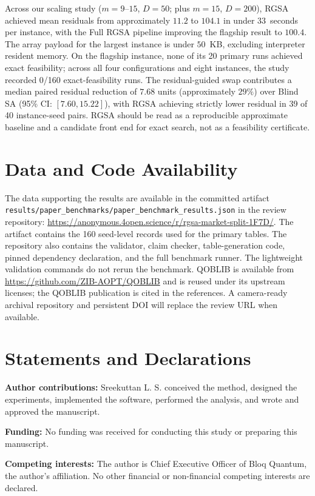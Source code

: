 \documentclass[11pt]{article}
\begin{document}
Across our scaling study ($m=9$--$15$, $D=50$; plus $m=15$, $D=200$), RGSA achieved mean residuals from approximately $11.2$ to $104.1$ in under $33$~seconds per instance, with the Full RGSA pipeline improving the flagship result to $100.4$. The array payload for the largest instance is under $50$~KB, excluding interpreter resident memory. On the flagship instance, none of its 20 primary runs achieved exact feasibility; across all four configurations and eight instances, the study recorded 0/160 exact-feasibility runs. The residual-guided swap contributes a median paired residual reduction of $7.68$ units (approximately $29\%$) over Blind SA (95\% CI: $[7.60,15.22]$), with RGSA achieving strictly lower residual in 39 of 40 instance-seed pairs. RGSA should be read as a reproducible approximate baseline and a candidate front end for exact search, not as a feasibility certificate.

\section*{Data and Code Availability}
The data supporting the results are available in the committed artifact \texttt{results/paper\_benchmarks/paper\_benchmark\_results.json} in the review repository: \url{https://anonymous.4open.science/r/rgsa-market-split-1F7D/}. The artifact contains the 160 seed-level records used for the primary tables. The repository also contains the validator, claim checker, table-generation code, pinned dependency declaration, and the full benchmark runner. The lightweight validation commands do not rerun the benchmark. QOBLIB is available from \url{https://github.com/ZIB-AOPT/QOBLIB} and is reused under its upstream licenses; the QOBLIB publication is cited in the references. A camera-ready archival repository and persistent DOI will replace the review URL when available.

\section*{Statements and Declarations}
\textbf{Author contributions:} Sreekuttan L. S. conceived the method, designed the experiments, implemented the software, performed the analysis, and wrote and approved the manuscript.

\textbf{Funding:} No funding was received for conducting this study or preparing this manuscript.

\textbf{Competing interests:} The author is Chief Executive Officer of Bloq Quantum, the author’s affiliation. No other financial or non-financial competing interests are declared.
\end{document}
